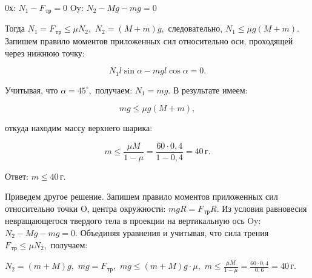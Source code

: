 \documentclass[12pt,a4paper]{article}
\begin{document}
{0х: $N_1 - F_{\,\text{тр}}=0$
Oy: $N_2 - Mg - mg=0$

Тогда $N_1=F_{\,\text{тр}} \leq \mu N_2,$ $N_2= ( M + m ) g,$ следовательно, $N_1 \leq \mu g ( M + m ) .$
Запишем правило моментов приложенных сил относительно оси, проходящей через нижнюю точку:

\[N_1l \sin \alpha - mgl \cos \alpha =0.\]

Учитывая, что $\alpha =45 ^\circ ,$ получаем: $N_1=mg.$
В результате имеем:

\[mg \leq \mu g ( M + m ) ,\]

откуда находим массу верхнего шарика:

\[m \leq \frac{\mu M}{1 - \mu} = \frac{60 \cdot 0{,}4}{1 - 0{,}4} =40\,\text{г}.\]

Ответ: $m \leq 40\,\text{г}.$

Приведем другое решение.
Запишем правило моментов приложенных сил относительно точки O, центра окружности: $mgR = F_{\,\text{тр}} R.$
Из условия равновесия невращающегося твердого тела в проекции на вертикальную ось Oy: $N_2 - Mg - mg = 0.$
Объединяя уравнения и учитывая, что сила трения $F_{\,\text{тр}} \leq \mu N_2,$ получаем:

$N_2 = ( m + M ) g,$
$mg = F_{\,\text{тр}},$
$mg \leq ( m + M ) g \cdot \mu,$
$m \leq \frac{\mu M}{1 - \mu} = \frac{60 \cdot 0{,}4}{0{,}6} = 40 \,\text{г}.$
}
\end{document}
